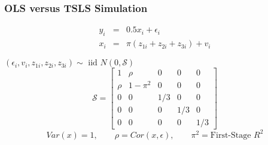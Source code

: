 

\begin{frame}
\frametitle{OLS versus TSLS Simulation}

\vspace{-2em}

	\begin{eqnarray*}
	y_i &=& 0.5 x_i + \epsilon_i\\
	x_i &=& \pi(z_{1i} + z_{2i} + z_{3i}) + v_i
\end{eqnarray*}

$(\epsilon_i, v_i, z_{1i}, z_{2i}, z_{3i}) \sim \mbox{ iid } N(0, \mathcal{S})$
$$	\mathcal{S} = \left[ \begin{array}
		{ccccc} 
		1 & \rho & 0 & 0 & 0\\
		\rho & 1 - \pi^2 & 0 & 0 & 0\\
		0 & 0 & 1/3 & 0 & 0\\
		0 & 0 & 0 & 1/3 & 0 \\
		0 & 0 & 0 & 0 & 1/3
	\end{array}\right]$$
	\alert{$$Var(x) = 1, \quad \quad \rho = Cor(x,\epsilon), \quad\quad \pi^2 = \mbox{First-Stage }  R^2$$}
\end{frame}

\begin{frame}
\footnotesize
\begin{figure}
	\centering
	
\end{figure}
\end{frame}

\begin{frame}
\footnotesize
\begin{figure}
	\centering
	
\end{figure}
\end{frame}

